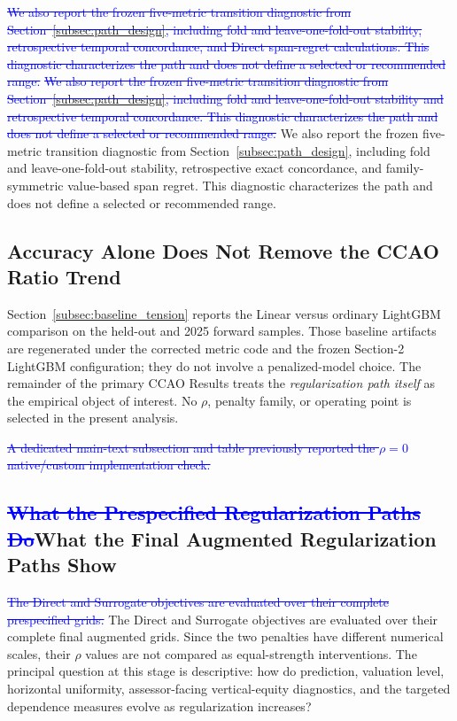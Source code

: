 \documentclass[10pt]{article}
\theoremstyle{definition}
\newcommand{\1}{\mathbf{1}}
\newcommand{\oldtext}[1]{\textcolor{blue}{\sout{#1}}}
\newcommand{\latesttext}[1]{\textcolor{latestPurple}{#1}}
\begin{document}
\oldtext{We also report the frozen five-metric transition diagnostic from Section~\ref{subsec:path_design}, including fold and leave-one-fold-out stability, retrospective temporal concordance, and Direct span-regret calculations. This diagnostic characterizes the path and does not define a selected or recommended range.}
\oldtext{We also report the frozen five-metric transition diagnostic from Section~\ref{subsec:path_design}, including fold and leave-one-fold-out stability and retrospective temporal concordance. This diagnostic characterizes the path and does not define a selected or recommended range.}
\latesttext{We also report the frozen five-metric transition diagnostic from Section~\ref{subsec:path_design}, including fold and leave-one-fold-out stability, retrospective exact concordance, and family-symmetric value-based span regret. This diagnostic characterizes the path and does not define a selected or recommended range.}

\subsection{Accuracy Alone Does Not Remove the CCAO Ratio Trend}
\label{subsec:ccao_baseline_results}

Section~\ref{subsec:baseline_tension} reports the Linear versus ordinary LightGBM
comparison on the held-out and 2025 forward samples. Those baseline artifacts are
regenerated under the corrected metric code and the frozen Section-2 LightGBM
configuration; they do not involve a penalized-model choice. The remainder of the
primary CCAO Results treats the \emph{regularization path itself} as the empirical
object of interest. No $\rho$, penalty family, or operating point is selected in the
present analysis.

\oldtext{A dedicated main-text subsection and table previously reported the $\rho=0$ native/custom implementation check.}



\subsection{\texorpdfstring{\oldtext{What the Prespecified Regularization Paths Do}\latesttext{What the Final Augmented Regularization Paths Show}}{What the Final Augmented Regularization Paths Show}}
\label{subsec:path_results}

\oldtext{The Direct and Surrogate objectives are evaluated over their complete prespecified grids.}
\latesttext{The Direct and Surrogate objectives are evaluated over their complete final augmented grids.} Since the two penalties have different numerical scales, their
$\rho$ values are not compared as equal-strength interventions. The principal
question at this stage is descriptive: how do prediction, valuation level,
horizontal uniformity, assessor-facing vertical-equity diagnostics, and the targeted
dependence measures evolve as regularization increases?
\end{document}
